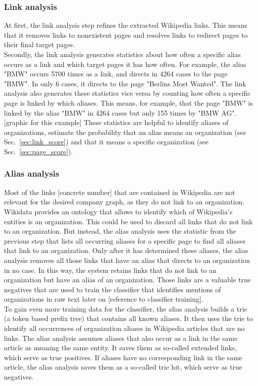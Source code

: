 \subsubsection{Link analysis}
At first, the link analysis step refines the extracted Wikipedia links. This means that it removes links to nonexistent pages and resolves links to redirect pages to their final target pages.\\
Secondly, the link analysis generates statistics about how often a specific alias occurs as a link and which target pages it has how often. For example, the alias "BMW" occurs 5700 times as a link, and directs in 4264 cases to the page "BMW". In only 6 cases, it directs to the page "Berlins Most Wanted". The link analysis also generates these statistics vice versa by counting how often a specific page is linked by which aliases. This means, for example, that the page "BMW" is linked by the alias "BMW" in 4264 cases but only 155 times by "BMW AG". [graphic for this example] These statistics are helpful to identify aliases of organizations, estimate the probability that an alias means an organization (see Sec.~\ref{sec:link_score}) and that it means a specific organization (see Sec.~\ref{sec:page_score}).\\

\subsubsection{Alias analysis}
\label{sec:alias_analysis}
Most of the links [concrete number] that are contained in Wikipedia are not relevant for the desired company graph, as they do not link to an organization. Wikidata provides an ontology that allows to identify which of Wikipedia's entities is an organization. This could be used to discard all links that do not link to an organization. But instead, the alias analysis uses the statistic from the previous step that lists all occurring aliases for a specific page to find all aliases that link to an organization. Only after it has determined these aliases, the alias analysis removes all those links that have an alias that directs to an organization in no case. In this way, the system retains links that do not link to an organization but have an alias of an organization. Those links are a valuable true negatives that are used to train the classifier that identifies mentions of organizations in raw text later on [reference to classifier training].\\
To gain even more training data for the classifier, the alias analysis builds a trie (a token based prefix tree) that contains all known aliases. It then uses the trie to identify all occurrences of organization aliases in Wikipedia articles that are no links. The alias analysis assumes aliases that also occur as a link in the same article as meaning the same entity. It saves them as so-called extended links, which serve as true positives. If aliases have no corresponding link in the same article, the alias analysis saves them as a so-called trie hit, which serve as true negatives.\\

